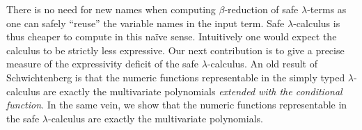\documentclass{llncs}
\begin{document}

There is no need for new names when computing $\beta$-reduction of
safe $\lambda$-terms as one can safely ``reuse'' the variable names in
the input term. Safe $\lambda$-calculus is thus cheaper to compute in
this na\"ive sense. Intuitively one would expect the calculus to be
strictly less expressive. Our next contribution is to give a precise
measure of the expressivity deficit of the safe $\lambda$-calculus. An
old result of Schwichtenberg \cite{citeulike:622637} is that the
numeric functions representable in the simply typed $\lambda$-calculus
are exactly the multivariate polynomials \emph{extended with the
  conditional function}.  In the same vein, we show that the numeric
functions representable in the safe $\lambda$-calculus are exactly the
multivariate polynomials.
\end{document}
